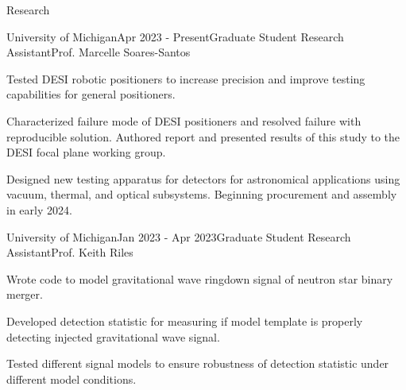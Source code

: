 \documentclass{resume} %
\begin{document}
\begin{rSection}{Research}

\begin{rSubsection}{University of Michigan}{Apr 2023 - Present}{Graduate Student Research Assistant}{Prof. Marcelle Soares-Santos}
    \item Tested DESI robotic positioners to increase precision and improve testing capabilities for general positioners.
    \item Characterized failure mode of DESI positioners and resolved failure with reproducible solution. Authored report and presented results of this study to the DESI focal plane working group.
    \item Designed new testing apparatus for detectors for astronomical applications using vacuum, thermal, and optical subsystems. Beginning procurement and assembly in early 2024. 
\end{rSubsection}

\begin{rSubsection}{University of Michigan}{Jan 2023 - Apr 2023}{Graduate Student Research Assistant}{Prof. Keith Riles}
    \item Wrote code to model gravitational wave ringdown signal of neutron star binary merger.
    \item Developed detection statistic for measuring if model template is properly detecting injected gravitational wave signal. 
    \item Tested different signal models to ensure robustness of detection statistic under different model conditions.
\end{rSubsection}


\end{rSection}
\end{document}
